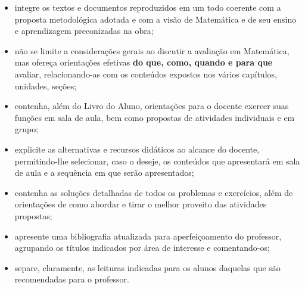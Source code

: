 \documentclass[a4paper, 12pt]{article}
\begin{document}
\begin{enumerate}
\begin{itemize}
  \item integre os textos e documentos reproduzidos em um todo coerente com a proposta metodológica adotada e com a visão de Matemática e de seu ensino e aprendizagem preconizadas na obra;
  \item não se limite a considerações gerais ao discutir a avaliação em Matemática, mas ofereça orientações efetivas \textbf{do que, como, quando e para que} avaliar,  relacionando-as  com  os  conteúdos  expostos  nos  vários  capítulos, unidades, seções;
  \item contenha,  além  do  Livro  do  Aluno,  orientações  para  o  docente  exercer suas funções em sala de aula, bem como propostas de atividades individuais e em grupo;
  \item explicite as alternativas e recursos didáticos ao alcance do docente, permitindo-lhe selecionar, caso o deseje, os conteúdos que apresentará em sala de aula e a sequência em que serão apresentados;
  \item contenha  as  soluções  detalhadas  de  todos  os  problemas  e  exercícios,  além de orientações de como abordar e tirar o melhor proveito das atividades propostas;
  \item apresente uma bibliografia atualizada para aperfeiçoamento do professor, agrupando os títulos indicados por área de interesse e comentando-os;
  \item separe,  claramente,  as  leituras  indicadas  para  os  alunos  daquelas  que são recomendadas para o professor.
  \end{itemize}
\end{enumerate}
\end{document}
